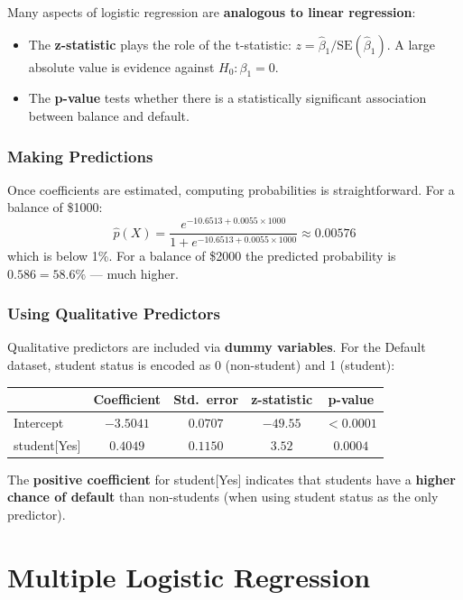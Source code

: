 \documentclass[11pt,a4paper]{article}
\theoremstyle{definition}
\theoremstyle{plain}
\theoremstyle{remark}
\begin{document}
Many aspects of logistic regression are \textbf{analogous to linear regression}:
\begin{itemize}
    \item The \textbf{z-statistic} plays the role of the t-statistic: $z = \hat{\beta}_1 / \mathrm{SE}(\hat{\beta}_1)$. A large absolute value is evidence against $H_0: \beta_1 = 0$.
    \item The \textbf{p-value} tests whether there is a statistically significant association between balance and default.
\end{itemize}

\subsubsection{Making Predictions}

Once coefficients are estimated, computing probabilities is straightforward. For a balance of \$1000:
\[
    \hat{p}(X) = \frac{e^{-10.6513 + 0.0055 \times 1000}}{1 + e^{-10.6513 + 0.0055 \times 1000}} \approx 0.00576
\]
which is below 1\%. For a balance of \$2000 the predicted probability is $0.586 = 58.6\%$ — much higher.

\subsubsection{Using Qualitative Predictors}

Qualitative predictors are included via \textbf{dummy variables}. For the Default dataset, student status is encoded as 0 (non-student) and 1 (student):

\begin{center}
\begin{tabular}{lcccc}
\hline
 & Coefficient & Std.\ error & z-statistic & p-value \\
\hline
Intercept      & $-3.5041$ & $0.0707$ & $-49.55$ & $<0.0001$ \\
student[Yes]   & $0.4049$  & $0.1150$ & $3.52$   & $0.0004$  \\
\hline
\end{tabular}
\end{center}

The \textbf{positive coefficient} for student[Yes] indicates that students have a \textbf{higher chance of default} than non-students (when using student status as the only predictor).

\section{Multiple Logistic Regression}
\end{document}
